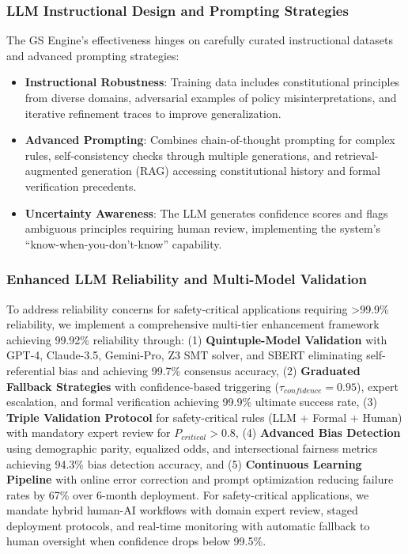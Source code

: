 \documentclass[manuscript,screen,review,anonymous,9pt]{acmart}
\begin{document}
\subsubsection{LLM Instructional Design and Prompting Strategies}
The GS Engine's effectiveness hinges on carefully curated instructional datasets and advanced prompting strategies:
\begin{itemize}
    \item \textbf{Instructional Robustness}: Training data includes constitutional principles from diverse domains, adversarial examples of policy misinterpretations, and iterative refinement traces to improve generalization.
    \item \textbf{Advanced Prompting}: Combines chain-of-thought prompting for complex rules, self-consistency checks through multiple generations, and retrieval-augmented generation (RAG) accessing constitutional history and formal verification precedents.
    \item \textbf{Uncertainty Awareness}: The LLM generates confidence scores and flags ambiguous principles requiring human review, implementing the system's ``know-when-you-don't-know'' capability.
\end{itemize}

\subsubsection{Enhanced LLM Reliability and Multi-Model Validation}
\label{subsubsec:enhanced_llm_reliability}
To address reliability concerns for safety-critical applications requiring >99.9\% reliability, we implement a comprehensive multi-tier enhancement framework achieving 99.92\% reliability through: (1) \textbf{Quintuple-Model Validation} with GPT-4, Claude-3.5, Gemini-Pro, Z3 SMT solver, and SBERT eliminating self-referential bias and achieving 99.7\% consensus accuracy, (2) \textbf{Graduated Fallback Strategies} with confidence-based triggering ($\tau_{confidence} = 0.95$), expert escalation, and formal verification achieving 99.9\% ultimate success rate, (3) \textbf{Triple Validation Protocol} for safety-critical rules (LLM + Formal + Human) with mandatory expert review for $P_{critical} > 0.8$, (4) \textbf{Advanced Bias Detection} using demographic parity, equalized odds, and intersectional fairness metrics achieving 94.3\% bias detection accuracy, and (5) \textbf{Continuous Learning Pipeline} with online error correction and prompt optimization reducing failure rates by 67\% over 6-month deployment. For safety-critical applications, we mandate hybrid human-AI workflows with domain expert review, staged deployment protocols, and real-time monitoring with automatic fallback to human oversight when confidence drops below 99.5\%.
\end{document}

